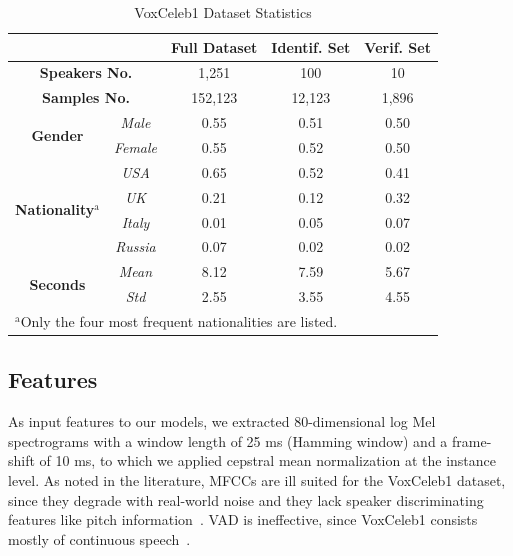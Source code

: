 \documentclass[conference]{IEEEtran}
\begin{document}
\begin{table}[htbp]
    \caption{VoxCeleb1 Dataset Statistics}
    \begin{center}
        \begin{tabular}{|c|c|c|c|c|}
        \cline{3-5}
        \multicolumn{2}{c|}{\textbf{}} & \textbf{Full Dataset} & \textbf{Identif. Set} & \textbf{Verif. Set}\\
        \hline
        \multicolumn{2}{|c|}{\textbf{Speakers No.}} & 1,251 & 100 & 10\\
        \hline
        \multicolumn{2}{|c|}{\textbf{Samples No.}} & 152,123 & 12,123 & 1,896 \\
        \hline
        \multirow{2}{*}{\textbf{Gender}} & \textit{Male} & 0.55 & 0.51 & 0.50 \\
        & \textit{Female} & 0.55 & 0.52 & 0.50 \\
        \hline
        \multirow{4}{*}{\textbf{Nationality}$^{\mathrm{a}}$} & \textit{USA} & 0.65 & 0.52 & 0.41 \\
        & \textit{UK} & 0.21 & 0.12 & 0.32 \\
        & \textit{Italy} & 0.01 & 0.05 & 0.07 \\
        & \textit{Russia} & 0.07 & 0.02 & 0.02 \\
        \hline
        \multirow{2}{*}{\textbf{Seconds}} & \textit{Mean} & 8.12 & 7.59 & 5.67 \\
        & \textit{Std} & 2.55 & 3.55 & 4.55 \\
        \hline
        \multicolumn{4}{l}{$^{\mathrm{a}}$Only the four most frequent nationalities are listed.}
        \end{tabular}
        \label{tab:dataset}
    \end{center}
\end{table}

\subsection{Features}

As input features to our models, we extracted 80-dimensional log Mel spectrograms with a window length of 25 ms (Hamming window) and a frame-shift of 10 ms, to which we applied cepstral mean normalization at the instance level. As noted in the literature, MFCCs are ill suited for the VoxCeleb1 dataset, since they degrade with real-world noise and they lack speaker discriminating features like pitch information~\cite{nagrani2020voxceleb}. VAD is ineffective, since VoxCeleb1 consists mostly of continuous speech~\cite{chung2020defence}.
\end{document}
